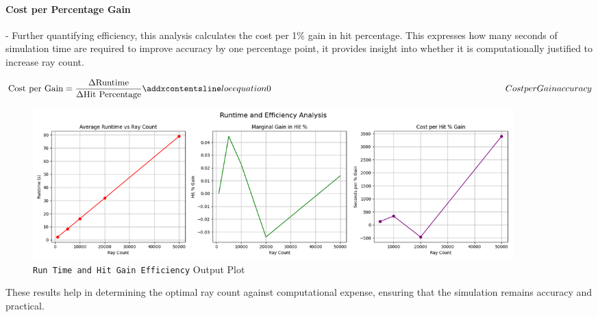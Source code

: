 \paragraph{\textbf{Cost per Percentage Gain}}
- Further quantifying efficiency, this analysis calculates the cost per 1\% gain in hit percentage. This expresses how many seconds of simulation time are required to improve accuracy by one percentage point, it provides insight into whether it is computationally justified to increase ray count. 

\begin{equation}
    \text{Cost per Gain} = \frac{\Delta \text{Runtime}}{\Delta \text{Hit Percentage}}
    \label{eq:Cost_per_Gain}
    \addequation{Cost per Gain accuracy}
\end{equation}

\vspace{1em}


\begin{figure}[htbp] %
    \centering
    \includegraphics[width=0.9\textwidth]{chapters/methodology/SoftwareModel/images/run time analysis.png} %
    \caption{\texttt{Run Time and Hit Gain Efficiency} Output Plot}       %
    \label{fig:Run Time and Hit Gain Efficiency}            %
\end{figure}  

These results help in determining the optimal ray count against computational expense, ensuring that the simulation remains accuracy and practical.




